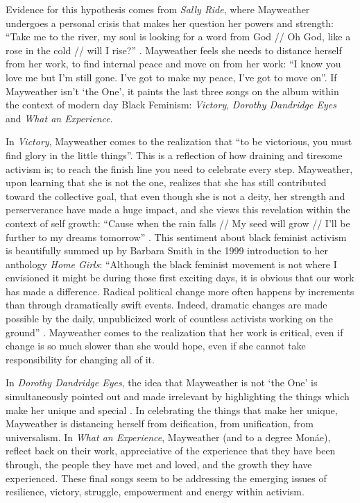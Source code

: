 \documentclass[a4paper, 11pt]{article} %
\begin{document}
Evidence for this hypothesis comes from \emph{Sally Ride}, where Mayweather undergoes a personal crisis that makes her question her powers and strength:
 ``Take me to the river, my soul is looking for a word from God // Oh God, like a rose in the cold // will I rise?'' \cite{sallyride}.
Mayweather feels she needs to distance herself from her work, to find internal peace and move on from her work:
 ``I know you love me but I'm still gone. I've got to make my peace, I've got to move on''\cite{sallyride}.
 If Mayweather isn't `the One', it paints the last three songs on the album within the context of modern day Black Feminism: \emph{Victory}, \emph{Dorothy Dandridge Eyes} and \emph{What an Experience}.
 
 In \emph{Victory}, Mayweather comes to the realization that ``to be victorious, you must find glory in the little things''\cite{victory}.
This is a reflection of how draining and tiresome activism is; to reach the finish line you need to celebrate every step.
Mayweather, upon learning that she is not the one, realizes that she has still contributed toward the collective goal, that even though she is not a deity, her strength and perserverance have made a huge impact, and she views this revelation within the context of self growth: 
 ``Cause when the rain falls // My seed will grow // I'll be further to my dreams tomorrow'' \cite{victory}.
 This sentiment about black feminist activism is beautifully summed up by Barbara Smith in the 1999 introduction to her anthology \emph{Home Girls}:
 ``Although the black feminist movement is not where I envisioned it might be during those first exciting days, it is obvious that our work has made a difference. Radical political change more often happens by increments than through dramatically swift events. Indeed, dramatic changes are made possible by the daily, unpublicized work of countless activists working on the ground'' \cite{smithhomegirls}.
 Mayweather comes to the realization that her work is critical, even if change is so much slower than she would hope, even if she cannot take responsibility for changing all of it.
 
 In \emph{Dorothy Dandridge Eyes}, the idea that Mayweather is not `the One' is simultaneously pointed out and made irrelevant by highlighting the things which make her unique and special \cite{dandridgeeyes}.
 In celebrating the things that make her unique, Mayweather is distancing herself from deification, from unification, from universalism.
 In \emph{What an Experience}, Mayweather (and to a degree Mon\'ae), reflect back on their work, appreciative of the experience that they have been through, the people they have met and loved, and the growth they have experienced. 
 These final songs seem to be addressing the emerging issues of resilience, victory, struggle, empowerment and energy within activism.
\end{document}
